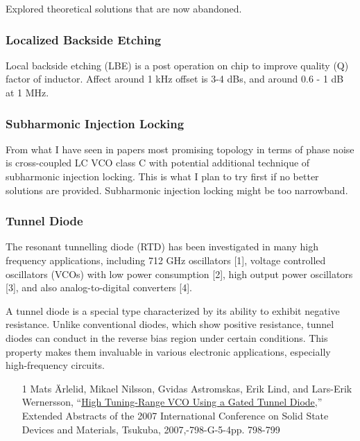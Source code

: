 Explored theoretical solutions that are now abandoned.

\subsubsection*{Localized Backside Etching}

Local backside etching (LBE) is a post operation on chip to improve quality (Q) factor of inductor. Affect around 1 kHz offset is 3-4 dBs, and around 0.6 - 1 dB at 1 MHz.

\subsubsection*{Subharmonic Injection Locking}
From what I have seen in papers most promising topology in terms of phase noise is cross-coupled LC VCO class C with potential additional technique of subharmonic injection locking. This is what I plan to try first if no better solutions are provided. Subharmonic injection locking might be too narrowband. %

\subsubsection*{Tunnel Diode}



\begin{info}
	The resonant tunnelling diode (RTD) has been investigated in many high frequency applications, including 712 GHz oscillators [1], voltage controlled oscillators (VCOs) with low power consumption [2], high output power oscillators [3], and also analog-to-digital converters [4].
\end{info}

A tunnel diode is a special type characterized by its ability to exhibit negative resistance. Unlike conventional diodes, which show positive resistance, tunnel diodes can conduct in the reverse bias region under certain conditions. This property makes them invaluable in various electronic applications, especially high-frequency circuits.

\begin{itemize}
	\item [1] Mats Ärlelid, Mikael Nilsson, Gvidas Astromskas, Erik Lind, and Lars-Erik Wernersson, “\href{https://confit.atlas.jp/guide/event-img/ssdm2007/G-5-4/public/pdf_archive?type=in}{High Tuning-Range VCO Using a Gated Tunnel Diode},” Extended Abstracts of the 2007 International Conference on Solid State Devices and Materials, Tsukuba, 2007,-798-G-5-4pp. 798-799
\end{itemize}

